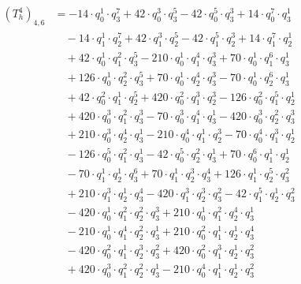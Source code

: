 \begin{align*}(T_{h}^4)_{4,6}&=-14\cdot q_0^{1}\cdot q_3^{7}+42\cdot q_0^{3}\cdot q_3^{5}-42\cdot q_0^{5}\cdot q_3^{3}+14\cdot q_0^{7}\cdot q_3^{1}\\
&\quad -14\cdot q_1^{1}\cdot q_2^{7}+42\cdot q_1^{3}\cdot q_2^{5}-42\cdot q_1^{5}\cdot q_2^{3}+14\cdot q_1^{7}\cdot q_2^{1}\\
&\quad +42\cdot q_0^{1}\cdot q_1^{2}\cdot q_3^{5}-210\cdot q_0^{1}\cdot q_1^{4}\cdot q_3^{3}+70\cdot q_0^{1}\cdot q_1^{6}\cdot q_3^{1}\\
&\quad +126\cdot q_0^{1}\cdot q_2^{2}\cdot q_3^{5}+70\cdot q_0^{1}\cdot q_2^{4}\cdot q_3^{3}-70\cdot q_0^{1}\cdot q_2^{6}\cdot q_3^{1}\\
&\quad +42\cdot q_0^{2}\cdot q_1^{1}\cdot q_2^{5}+420\cdot q_0^{2}\cdot q_1^{3}\cdot q_2^{3}-126\cdot q_0^{2}\cdot q_1^{5}\cdot q_2^{1}\\
&\quad +420\cdot q_0^{3}\cdot q_1^{2}\cdot q_3^{3}-70\cdot q_0^{3}\cdot q_1^{4}\cdot q_3^{1}-420\cdot q_0^{3}\cdot q_2^{2}\cdot q_3^{3}\\
&\quad +210\cdot q_0^{3}\cdot q_2^{4}\cdot q_3^{1}-210\cdot q_0^{4}\cdot q_1^{1}\cdot q_2^{3}-70\cdot q_0^{4}\cdot q_1^{3}\cdot q_2^{1}\\
&\quad -126\cdot q_0^{5}\cdot q_1^{2}\cdot q_3^{1}-42\cdot q_0^{5}\cdot q_2^{2}\cdot q_3^{1}+70\cdot q_0^{6}\cdot q_1^{1}\cdot q_2^{1}\\
&\quad -70\cdot q_1^{1}\cdot q_2^{1}\cdot q_3^{6}+70\cdot q_1^{1}\cdot q_2^{3}\cdot q_3^{4}+126\cdot q_1^{1}\cdot q_2^{5}\cdot q_3^{2}\\
&\quad +210\cdot q_1^{3}\cdot q_2^{1}\cdot q_3^{4}-420\cdot q_1^{3}\cdot q_2^{3}\cdot q_3^{2}-42\cdot q_1^{5}\cdot q_2^{1}\cdot q_3^{2}\\
&\quad -420\cdot q_0^{1}\cdot q_1^{2}\cdot q_2^{2}\cdot q_3^{3}+210\cdot q_0^{1}\cdot q_1^{2}\cdot q_2^{4}\cdot q_3^{1}\\
&\quad -210\cdot q_0^{1}\cdot q_1^{4}\cdot q_2^{2}\cdot q_3^{1}+210\cdot q_0^{2}\cdot q_1^{1}\cdot q_2^{1}\cdot q_3^{4}\\
&\quad -420\cdot q_0^{2}\cdot q_1^{1}\cdot q_2^{3}\cdot q_3^{2}+420\cdot q_0^{2}\cdot q_1^{3}\cdot q_2^{1}\cdot q_3^{2}\\
&\quad +420\cdot q_0^{3}\cdot q_1^{2}\cdot q_2^{2}\cdot q_3^{1}-210\cdot q_0^{4}\cdot q_1^{1}\cdot q_2^{1}\cdot q_3^{2}\end{align*}
